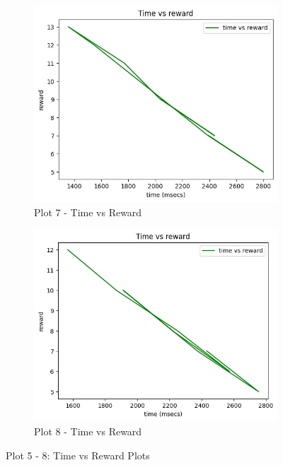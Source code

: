 \documentclass[conference]{IEEEtran}
\begin{document}
\begin{figure}[htbp]
  \vspace{0.5cm}
  
  \begin{subfigure}[t]{0.45\linewidth}
    \centering
    \includegraphics[width=\linewidth]{Plots/tvr 3.jpg}
    \caption{Plot 7 - Time vs Reward}
    \label{fig:figure87}
  \end{subfigure}
  \hfill
  \begin{subfigure}[t]{0.45\linewidth}
    \centering
    \includegraphics[width=\linewidth]{Plots/tvr cc 1.jpg}
    \caption{Plot 8 - Time vs Reward}
    \label{fig:figure86}
  \end{subfigure}
  \caption{Plot 5 - 8: Time vs Reward Plots}
  \label{fig:allfigures}
\end{figure}
\end{document}

